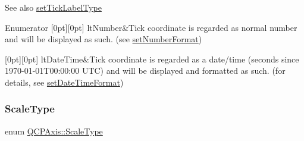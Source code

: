 \begin{DoxySeeAlso}{See also}
\mbox{\hyperlink{class_q_c_p_axis_a54f24f5ce8feea25209388a863d7e448}{set\+Tick\+Label\+Type}} 
\end{DoxySeeAlso}
\begin{DoxyEnumFields}{Enumerator}
[0pt][0pt]{}\mbox{\label{class_q_c_p_axis_a4a7da0166f755f5abac23b765d184cada7f1eacf3b73adaefd334bea04e094b7e}} 
lt\+Number&Tick coordinate is regarded as normal number and will be displayed as such. (see \mbox{\hyperlink{class_q_c_p_axis_ae585a54dc2aac662e90a2ca82f002590}{set\+Number\+Format}}) \\
\hline

[0pt][0pt]{}\mbox{\label{class_q_c_p_axis_a4a7da0166f755f5abac23b765d184cadafc70594a9d877124dd11ccc187d4ac52}} 
lt\+Date\+Time&Tick coordinate is regarded as a date/time (seconds since 1970-\/01-\/01\+T00\+:00\+:00 U\+TC) and will be displayed and formatted as such. (for details, see \mbox{\hyperlink{class_q_c_p_axis_a2ee0191daa03524a682113e63e05f7a7}{set\+Date\+Time\+Format}}) \\
\hline

\end{DoxyEnumFields}
\mbox{\label{class_q_c_p_axis_a36d8e8658dbaa179bf2aeb973db2d6f0}} 
\subsubsection{\texorpdfstring{Scale\+Type}{ScaleType}}
{\footnotesize\ttfamily enum \mbox{\hyperlink{class_q_c_p_axis_a36d8e8658dbaa179bf2aeb973db2d6f0}{Q\+C\+P\+Axis\+::\+Scale\+Type}}}

